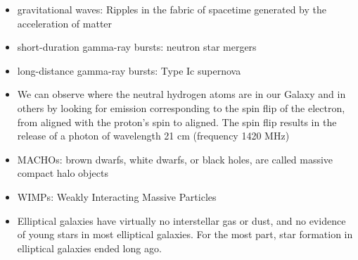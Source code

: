 \documentclass[10pt,landscape]{article}
\begin{document}
\begin{multicols}{3}
\begin{itemize}
    \item gravitational waves: Ripples in the fabric of spacetime generated by the acceleration of matter
    \item short-duration gamma-ray bursts: neutron star mergers
    \item long-distance gamma-ray bursts: Type Ic supernova
    \item We can observe where the neutral hydrogen atoms are in our Galaxy and in others by looking for emission corresponding to the spin flip of the electron, from aligned with the proton’s spin to aligned. The spin flip results in the release of a photon of wavelength 21 cm (frequency 1420 MHz)
    \item MACHOs: brown dwarfs, white dwarfs, or black holes, are called massive compact halo objects
    \item WIMPs: Weakly Interacting Massive Particles
    \item Elliptical galaxies have virtually no interstellar gas or dust, and no evidence of young stars in most elliptical galaxies. For the most part, star formation in elliptical galaxies ended long ago.
\end{itemize}

\end{multicols}
\end{document}
